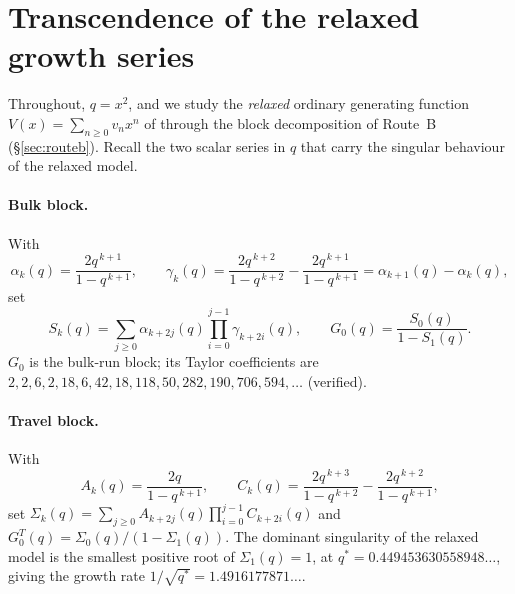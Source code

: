 %

\section{Transcendence of the relaxed growth series}
\label{sec:transcendence}

Throughout, $q=x^{2}$, and we study the \emph{relaxed} ordinary generating
function $V(x)=\sum_{n\ge0}v_n x^{n}$ of \cite[A396406]{OEIS} through the
block decomposition of Route~B (\S\ref{sec:routeb}). Recall the two scalar
series in $q$ that carry the singular behaviour of the relaxed model.

\paragraph{Bulk block.} With
\begin{equation}\label{eq:alphagamma}
  \alpha_k(q)=\frac{2q^{\,k+1}}{1-q^{\,k+1}},\qquad
  \gamma_k(q)=\frac{2q^{\,k+2}}{1-q^{\,k+2}}-\frac{2q^{\,k+1}}{1-q^{\,k+1}}
            =\alpha_{k+1}(q)-\alpha_k(q),
\end{equation}
set
\begin{equation}\label{eq:Sk}
  S_k(q)=\sum_{j\ge0}\alpha_{k+2j}(q)\prod_{i=0}^{j-1}\gamma_{k+2i}(q),
  \qquad
  G_0(q)=\frac{S_0(q)}{1-S_1(q)} .
\end{equation}
$G_0$ is the bulk-run block; its Taylor coefficients are
$2,2,6,2,18,6,42,18,118,50,282,190,706,594,\dots$ (verified).

\paragraph{Travel block.} With
\begin{equation}\label{eq:AC}
  A_k(q)=\frac{2q}{1-q^{\,k+1}},\qquad
  C_k(q)=\frac{2q^{\,k+3}}{1-q^{\,k+2}}-\frac{2q^{\,k+2}}{1-q^{\,k+1}},
\end{equation}
set $\Sigma_k(q)=\sum_{j\ge0}A_{k+2j}(q)\prod_{i=0}^{j-1}C_{k+2i}(q)$ and
$G^{T}_0(q)=\Sigma_0(q)/(1-\Sigma_1(q))$. The dominant singularity of the
relaxed model is the smallest positive root of $\Sigma_1(q)=1$, at
$q^{\ast}=0.449453630558948\ldots$, giving the growth rate
$1/\sqrt{q^{\ast}}=1.4916177871\ldots$.

